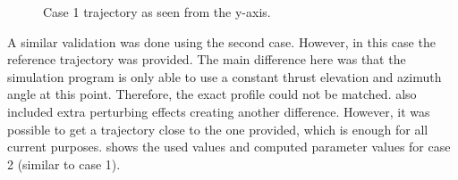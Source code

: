 


\begin{figure}[H]
\centering
\caption{Case 1 trajectory as seen from the y-axis.}
\label{fig:PlotFigure1SeenFromZoomYaxis}
\end{figure}




\noindent
A similar validation was done using the second case. However, in this case the reference trajectory was provided. The main difference here was that the simulation program is only able to use a constant thrust elevation and azimuth angle at this point. Therefore, the exact profile could not be matched. \cite{benito2016trajectory} also included extra perturbing effects creating another difference. However, it was possible to get a trajectory close to the one provided, which is enough for all current purposes.  shows the used values and computed parameter values for case 2 (similar to case 1).  




